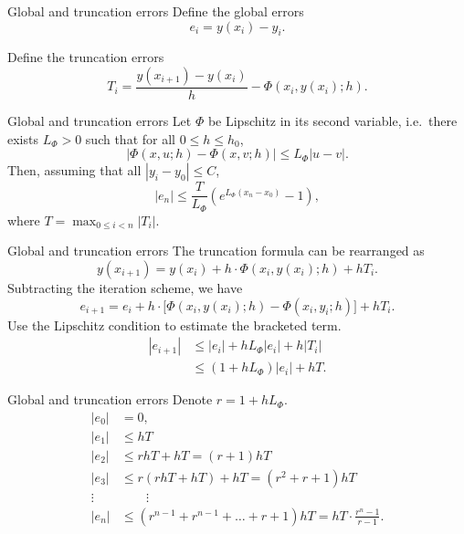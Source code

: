 \documentclass{beamer}
\begin{document}
    \begin{frame}{Global and truncation errors}
        Define the global errors \[
            e_i = y(x_i) - y_i.
        \]

        Define the truncation errors \[
            T_i = \frac{y(x_{i + 1}) - y(x_i)}{h} - \Phi(x_i, y(x_i); h).
        \] 
    \end{frame}

    \begin{frame}{Global and truncation errors}
        Let $\Phi$ be Lipschitz in its second variable, i.e.\ there exists $L_\Phi >
        0$ such that for all $0 \leq h \leq h_0$, \[
            |\Phi(x, u; h) - \Phi(x, v; h)| \leq L_\Phi|u - v|.
        \] Then, assuming that all $|y_i - y_0| \leq C$, \[
            |e_n| \leq \frac{T}{L_\Phi}\left(e^{L_\Phi(x_n - x_0)} - 1\right),
        \] where $T = \max_{0 \leq i < n}|T_i|$.
    \end{frame}

    \begin{frame}{Global and truncation errors}
        The truncation formula can be rearranged as \[
            y(x_{i + 1}) = y(x_i) + h\cdot \Phi(x_i, y(x_i); h) + hT_i.
        \] Subtracting the iteration scheme, we have \[
            e_{i + 1} = e_i + h\cdot \Big[\Phi(x_i, y(x_i); h) - \Phi(x_i, y_i;
            h)\Big] + hT_i.
        \] Use the Lipschitz condition to estimate the bracketed term. \begin{align*}
            |e_{i + 1}| &\leq |e_i| + hL_\Phi|e_i| + h|T_i| \\
            &\leq (1 + hL_\Phi)|e_i| + hT.
        \end{align*}
    \end{frame}

    \begin{frame}{Global and truncation errors}
        Denote $r = 1 + hL_\Phi$.
        \begin{align*}
            |e_0| &= 0, \\
            |e_1| &\leq hT \\
            |e_2| &\leq rhT + hT = (r + 1)hT \\
            |e_3| &\leq r(rhT + hT) + hT = (r^2 + r + 1)hT \\
            \vdots &\qquad \vdots \\
            |e_n| &\leq (r^{n - 1} + r^{n - 1} + \dots + r + 1)hT = hT\cdot \frac{r^n -
            1}{r - 1}.
        \end{align*}
    \end{frame}
\end{document}
